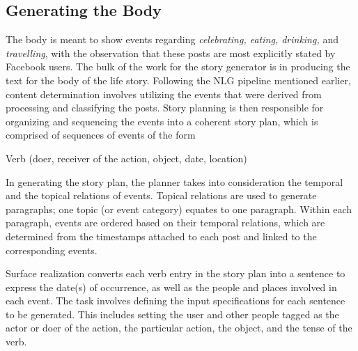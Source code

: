 \subsection{Generating the Body}
The body is meant to show events regarding \textit{celebrating, eating, drinking,} and \textit{travelling}, with the observation that these posts are most explicitly stated by Facebook users. The bulk of the work for the story generator is in producing the text for the body of the life story. Following the NLG pipeline mentioned earlier, content determination involves utilizing the events that were derived from processing and classifying the posts. Story planning is then responsible for organizing and sequencing the events into a coherent story plan, which is comprised of sequences of events of the form

\begin{center} Verb (doer, receiver of the action, object, date, location) \end{center}

In generating the story plan, the planner takes into consideration the temporal and the topical relations of events. Topical relations are used to generate paragraphs; one topic (or event category) equates to one paragraph. Within each paragraph, events are ordered based on their temporal relations, which are determined from the timestamps attached to each post and linked to the corresponding events.

Surface realization converts each verb entry in the story plan into a sentence to express the date(s) of occurrence, as well as the people and places involved in each event. The task involves defining the input specifications for each sentence to be generated. This includes setting the user and other people tagged as the actor or doer of the action, the particular action, the object, and the tense of the verb.

